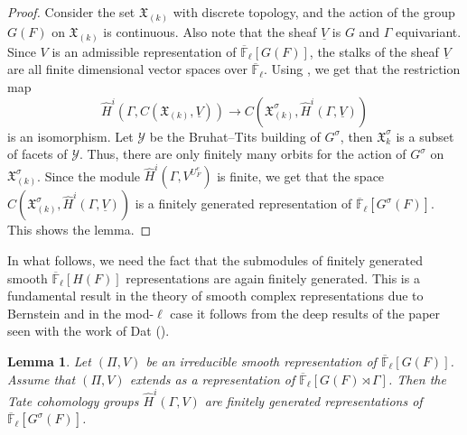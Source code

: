 \documentclass[10pt, reqno]{amsart}
\theoremstyle{plain}
\numberwithin{equation}{section} \newcommand{\di}{\operatorname{dim}}
\newtheorem{lemma}[theorem]{Lemma}
\begin{document}
\begin{proof}
  Consider the set $\mathfrak{X}_{(k)}$ with discrete topology, and
  the action of the group $G(F)$ on $\mathfrak{X}_{(k)}$ is
  continuous. Also note that the sheaf $\underline{V}$ is $G$ and
  $\Gamma$ equivariant.  Since $V$ is an admissible
  representation of $\overline {\mathbb{F}}_\ell[G(F)]$, the stalks of
  the sheaf $\underline{V}$ are all finite dimensional vector spaces
  over $\overline{\mathbb{F}}_\ell$. Using \cite[Proposition
  3.3]{Treumann_Venkatesh_linkage}, we get that the restriction map
$$ \widehat{H}^i(\Gamma, C(\mathfrak{X}_{(k)}, 
\underline{V}))\rightarrow C(\mathfrak{X}_{(k)}^\sigma,
\widehat{H}^i(\Gamma, \underline{V})) $$ is an isomorphism. Let
$\mathcal{Y}$ be the Bruhat--Tits building of $G^\sigma$, then
$\mathfrak{X}^\sigma_{k}$ is a subset of facets of
$\mathcal{Y}$. Thus, there are only finitely many orbits for the
action of $G^\sigma$ on $\mathfrak{X}^\sigma_{(k)}$. Since the module
$\widehat{H}^i(\Gamma, V^{U_F^e})$ is finite, we get that the space
$C(\mathfrak{X}_{(k)}^\sigma, \widehat{H}^i(\Gamma, \underline{V})) $ is a
finitely generated representation of
$\overline{\mathbb{F}}_\ell[G^\sigma(F)]$. This shows the lemma.
\end{proof}
In what follows, we need the fact that the submodules of finitely generated
smooth $\overline{\mathbb{F}}_\ell[H(F)]$  representations are again finitely
generated.  This is a fundamental result in the theory of smooth
complex representations due to Bernstein and in the mod-$\ell$ case it
follows from the deep results of the paper \cite[Corollary
1.3]{dat_jams} seen with the work of Dat (\cite[Corollary
4.5]{Dat_finiteness}).
\begin{lemma}\label{finite_gen_2]}
Let $(\Pi,V)$ be an irreducible smooth representation of
$\overline{\mathbb{F}}_\ell[G(F)]$. 
Assume that $(\Pi,V)$ extends as a
representation of $\overline
{\mathbb{F}}_\ell[G(F)\rtimes \Gamma]$. Then the Tate
cohomology groups $\widehat{H}^i(\Gamma, V)$ 
are finitely generated
representations of $\overline
{\mathbb{F}}_\ell[G^\sigma(F)]$.
\end{lemma}
\end{document}
